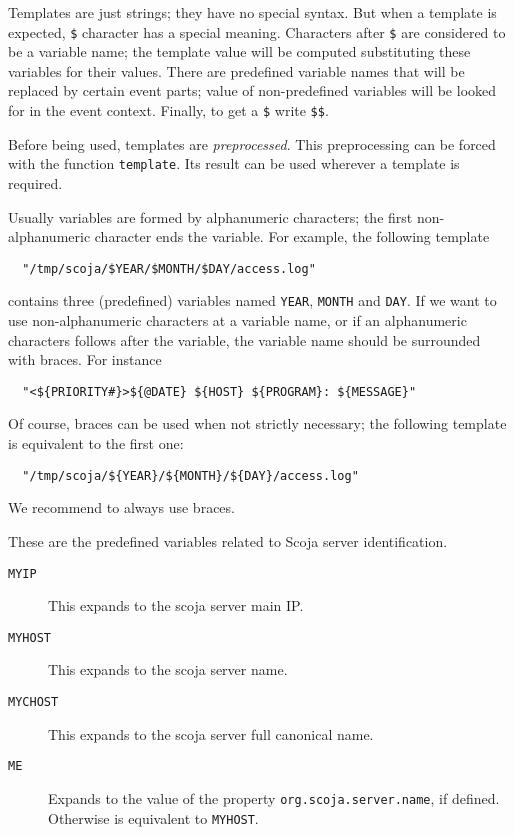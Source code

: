Templates are just strings; they have no special syntax.
But when a template is expected, \verb|$| character has a special
meaning.
Characters after \verb|$| are considered to be a variable name;
the template value will be computed substituting these variables for
their values.
There are predefined variable names that will be replaced by certain
event parts;
value of non-predefined variables will be looked for in the event
context.
Finally, to get a \verb|$| write \verb|$$|.

Before being used, templates are \emph{preprocessed}.
This preprocessing can be forced with the function {\tt template}.
Its result can be used wherever a template is required.

Usually variables are formed by alphanumeric characters;
the first non-alphanumeric character ends the variable.
For example, the following template
\begin{verbatim}
  "/tmp/scoja/$YEAR/$MONTH/$DAY/access.log"
\end{verbatim}
contains three (predefined) variables named 
  \verb|YEAR|, \verb|MONTH| and \verb|DAY|.
If we want to use non-alphanumeric characters at a variable name,
or if an alphanumeric characters follows after the variable,
the variable name should be surrounded with braces.
For instance
\begin{verbatim}
  "<${PRIORITY#}>${@DATE} ${HOST} ${PROGRAM}: ${MESSAGE}"
\end{verbatim}
Of course, braces can be used when not strictly necessary;
the following template is equivalent to the first one:
\begin{verbatim}
  "/tmp/scoja/${YEAR}/${MONTH}/${DAY}/access.log"
\end{verbatim}
We recommend to always use braces.

These are the predefined variables related to Scoja server
identification.
\begin{description}
  \item[{\tt MYIP}]
    This expands to the scoja server main IP.
  \item[{\tt MYHOST}]
    This expands to the scoja server name.
  \item[{\tt MYCHOST}]
    This expands to the scoja server full canonical name.
  \item[{\tt ME}]
    Expands to the value of the property {\tt org.scoja.server.name},
    if defined.
    Otherwise is equivalent to {\tt MYHOST}.
\end{description}

